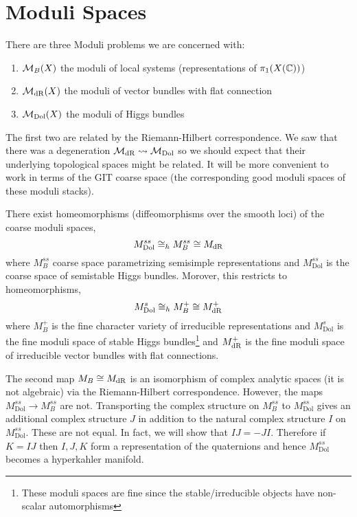 \documentclass[12pt]{article}
\begin{document}
\section{Moduli Spaces}

\newcommand{\Dol}{\mathrm{Dol}}

There are three Moduli problems we are concerned with:
\begin{enumerate}
\item  $\mathcal{M}_B(X)$ the moduli of local systems (representations of $\pi_1(X(\mathbb{C}))$)
\item $\mathcal{M}_{\mathrm{dR}}(X)$ the moduli of vector bundles with flat connection
\item $\M_{\Dol}(X)$ the moduli of Higgs bundles 
\end{enumerate}

The first two are related by the Riemann-Hilbert correspondence. We saw that there was a degeneration $\M_{\dR} \spto \M_{\Dol}$ so we should expect that their underlying topological spaces might be related. It will be more convenient to work in terms of the GIT coarse space (the corresponding good moduli spaces of these moduli stacks). 

\begin{theorem}
There exist homeomorphisms (diffeomorphisms over the smooth loci) of the coarse moduli spaces,
\[ M_{\Dol}^{ss} \cong_h M_B^{ss} \cong M_{\dR} \]
where $M_B^{ss}$ coarse space parametrizing semisimple representations and $M_{\Dol}^{ss}$ is the coarse space of semistable Higgs bundles. Morover, this restricts to homeomorphisms,
\[ M_{\Dol}^{s} \cong_h M_B^{+} \cong M_{\dR}^{+} \]
where $M_B^{+}$ is the fine character variety of irreducible representations and $M_{\Dol}^{s}$ is the fine moduli space of stable Higgs bundles\footnote{These moduli spaces are fine since the stable/irreducible objects have non-scalar automorphisms} and $M_{\mathrm{dR}}^{+}$ is the fine moduli space of irreducible vector bundles with flat connections.
\end{theorem}

\begin{rmk}
The second map $M_B \cong M_{\mathrm{dR}}$ is an isomorphism of complex analytic spaces (it is not algebraic) via the Riemann-Hilbert correspondence. However, the maps $M_{\Dol}^{ss} \to M_B^{ss}$ are not. Transporting the complex structure on $M_B^{ss}$ to $M_{\Dol}^{ss}$ gives an additional complex structure $J$ in addition to the natural complex structure $I$ on $M_{\Dol}^{ss}$. These are not equal. In fact, we will show that $IJ = -JI$. Therefore if $K = IJ$ then $I,J,K$ form a representation of the quaternions and hence $M_{\Dol}^{ss}$ becomes a hyperkahler manifold.
\end{rmk}
\end{document}
